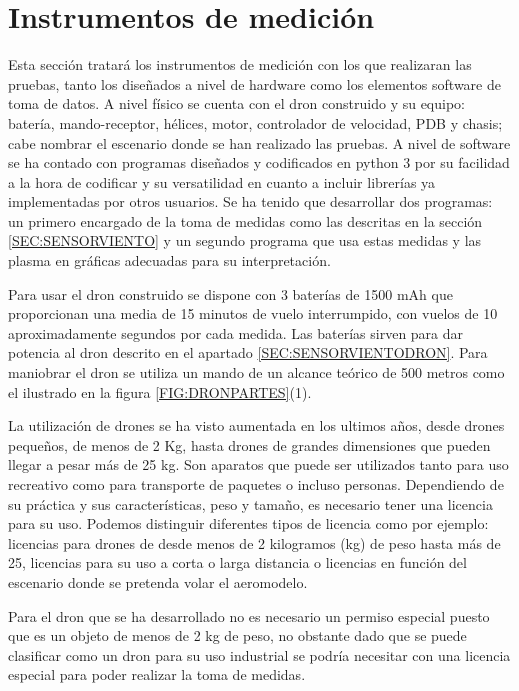 
\section{Instrumentos de medición\label{SEC:INSTR}}
	Esta sección tratará los instrumentos de medición con los que realizaran las pruebas, tanto los diseñados a nivel de hardware como los elementos software de toma de datos. 
	A nivel físico se cuenta con el dron construido y su equipo: batería, mando-receptor, hélices, motor, controlador de velocidad, PDB y chasis; cabe nombrar el escenario donde se han realizado las pruebas. A nivel de software se ha contado con programas diseñados y codificados en python 3 por su facilidad a la hora de codificar y su versatilidad en cuanto a incluir librerías ya implementadas por otros usuarios. Se ha tenido que desarrollar dos programas: un primero encargado de la toma de medidas como las descritas en la sección \ref{SEC:SENSORVIENTO} y un segundo programa que usa estas medidas y las plasma en gráficas adecuadas para su interpretación.
	
	
	Para usar el dron construido se dispone con 3 baterías de 1500 mAh que proporcionan una media de 15 minutos de vuelo interrumpido, con vuelos de 10 aproximadamente segundos por cada medida.
Las baterías sirven para dar potencia al dron descrito en el apartado \ref{SEC:SENSORVIENTODRON}. Para maniobrar el dron se utiliza un mando de un alcance teórico de 500 metros como el ilustrado en la figura \ref{FIG:DRONPARTES}(1).

La utilización de drones se ha visto aumentada en los ultimos años, desde drones pequeños, de menos de 2 Kg, hasta drones de grandes dimensiones que pueden llegar a pesar más de 25 kg. Son aparatos que puede ser utilizados tanto para uso recreativo como para transporte de paquetes o incluso personas. Dependiendo de su práctica y sus características, peso y tamaño, es necesario tener una licencia para su uso. Podemos distinguir diferentes tipos de licencia como por ejemplo: licencias para drones de desde menos de 2 kilogramos (kg) de peso hasta más de 25, licencias para su uso a corta o larga distancia o licencias en función del escenario donde se pretenda volar el aeromodelo.

Para el dron que se ha desarrollado no es necesario un permiso especial puesto que es un objeto de menos de 2 kg de peso, no obstante dado que se puede clasificar como un dron para su uso industrial se podría necesitar con una licencia especial para poder realizar la toma de medidas.

